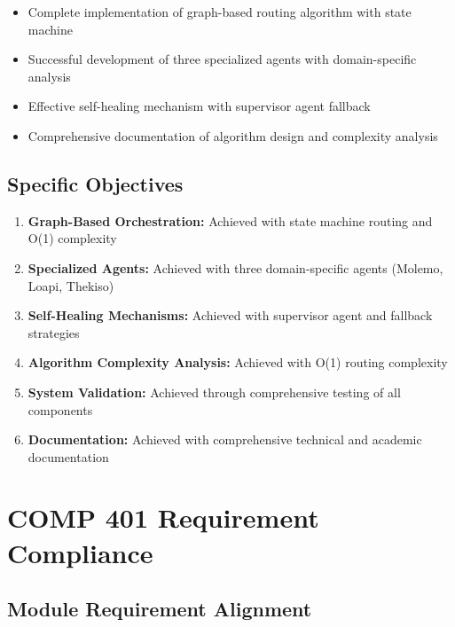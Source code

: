 \begin{itemize}
    \item Complete implementation of graph-based routing algorithm with state machine
    \item Successful development of three specialized agents with domain-specific analysis
    \item Effective self-healing mechanism with supervisor agent fallback
    \item Comprehensive documentation of algorithm design and complexity analysis
\end{itemize}

\subsection{Specific Objectives}

\begin{enumerate}
    \item \textbf{Graph-Based Orchestration:} Achieved with state machine routing and O(1) complexity
    
    \item \textbf{Specialized Agents:} Achieved with three domain-specific agents (Molemo, Loapi, Thekiso)
    
    \item \textbf{Self-Healing Mechanisms:} Achieved with supervisor agent and fallback strategies
    
    \item \textbf{Algorithm Complexity Analysis:} Achieved with O(1) routing complexity
    
    \item \textbf{System Validation:} Achieved through comprehensive testing of all components
    
    \item \textbf{Documentation:} Achieved with comprehensive technical and academic documentation
\end{enumerate}

\section{COMP 401 Requirement Compliance}

\subsection{Module Requirement Alignment}

